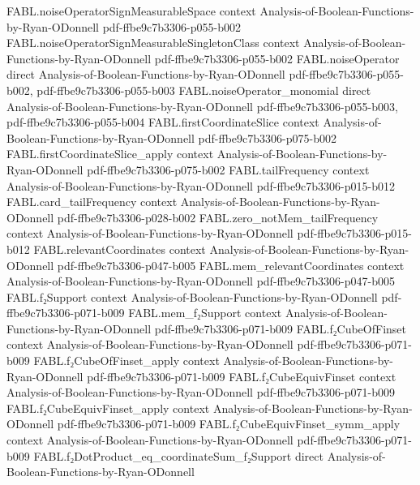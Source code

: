 \begin{theorem}
\proofstep
  {FABL.noiseOperatorSignMeasurableSpace}
  {context}
  {Analysis-of-Boolean-Functions-by-Ryan-ODonnell}
  {pdf-ffbe9c7b3306-p055-b002}
\proofstep
  {FABL.noiseOperatorSignMeasurableSingletonClass}
  {context}
  {Analysis-of-Boolean-Functions-by-Ryan-ODonnell}
  {pdf-ffbe9c7b3306-p055-b002}
\proofstep
  {FABL.noiseOperator}
  {direct}
  {Analysis-of-Boolean-Functions-by-Ryan-ODonnell}
  {pdf-ffbe9c7b3306-p055-b002,
    pdf-ffbe9c7b3306-p055-b003}
\proofstep
  {FABL.noiseOperator_monomial}
  {direct}
  {Analysis-of-Boolean-Functions-by-Ryan-ODonnell}
  {pdf-ffbe9c7b3306-p055-b003,
    pdf-ffbe9c7b3306-p055-b004}
\proofstep
  {FABL.firstCoordinateSlice}
  {context}
  {Analysis-of-Boolean-Functions-by-Ryan-ODonnell}
  {pdf-ffbe9c7b3306-p075-b002}
\proofstep
  {FABL.firstCoordinateSlice_apply}
  {context}
  {Analysis-of-Boolean-Functions-by-Ryan-ODonnell}
  {pdf-ffbe9c7b3306-p075-b002}
\proofstep
  {FABL.tailFrequency}
  {context}
  {Analysis-of-Boolean-Functions-by-Ryan-ODonnell}
  {pdf-ffbe9c7b3306-p015-b012}
\proofstep
  {FABL.card_tailFrequency}
  {context}
  {Analysis-of-Boolean-Functions-by-Ryan-ODonnell}
  {pdf-ffbe9c7b3306-p028-b002}
\proofstep
  {FABL.zero_notMem_tailFrequency}
  {context}
  {Analysis-of-Boolean-Functions-by-Ryan-ODonnell}
  {pdf-ffbe9c7b3306-p015-b012}
\proofstep
  {FABL.relevantCoordinates}
  {context}
  {Analysis-of-Boolean-Functions-by-Ryan-ODonnell}
  {pdf-ffbe9c7b3306-p047-b005}
\proofstep
  {FABL.mem_relevantCoordinates}
  {context}
  {Analysis-of-Boolean-Functions-by-Ryan-ODonnell}
  {pdf-ffbe9c7b3306-p047-b005}
\proofstep
  {FABL.f₂Support}
  {context}
  {Analysis-of-Boolean-Functions-by-Ryan-ODonnell}
  {pdf-ffbe9c7b3306-p071-b009}
\proofstep
  {FABL.mem_f₂Support}
  {context}
  {Analysis-of-Boolean-Functions-by-Ryan-ODonnell}
  {pdf-ffbe9c7b3306-p071-b009}
\proofstep
  {FABL.f₂CubeOfFinset}
  {context}
  {Analysis-of-Boolean-Functions-by-Ryan-ODonnell}
  {pdf-ffbe9c7b3306-p071-b009}
\proofstep
  {FABL.f₂CubeOfFinset_apply}
  {context}
  {Analysis-of-Boolean-Functions-by-Ryan-ODonnell}
  {pdf-ffbe9c7b3306-p071-b009}
\proofstep
  {FABL.f₂CubeEquivFinset}
  {context}
  {Analysis-of-Boolean-Functions-by-Ryan-ODonnell}
  {pdf-ffbe9c7b3306-p071-b009}
\proofstep
  {FABL.f₂CubeEquivFinset_apply}
  {context}
  {Analysis-of-Boolean-Functions-by-Ryan-ODonnell}
  {pdf-ffbe9c7b3306-p071-b009}
\proofstep
  {FABL.f₂CubeEquivFinset_symm_apply}
  {context}
  {Analysis-of-Boolean-Functions-by-Ryan-ODonnell}
  {pdf-ffbe9c7b3306-p071-b009}
\proofstep
  {FABL.f₂DotProduct_eq_coordinateSum_f₂Support}
  {direct}
  {Analysis-of-Boolean-Functions-by-Ryan-ODonnell}

\end{theorem}
